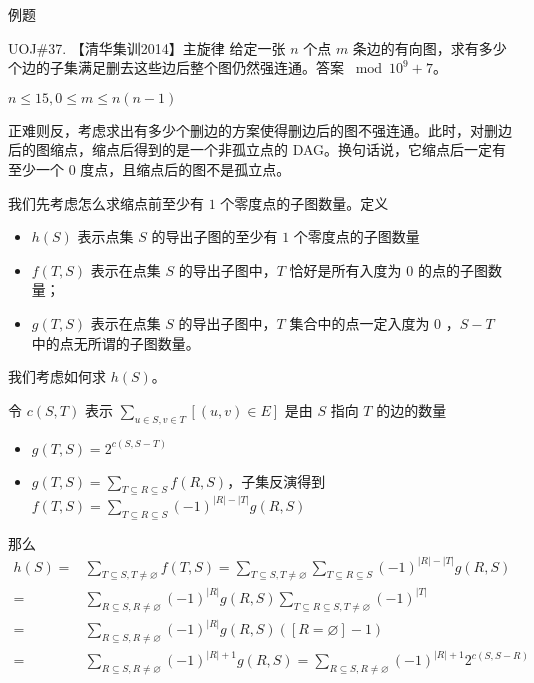 \documentclass[UTF8]{beamer}
\begin{document}
    \begin{frame}{例题}
        \begin{block}{UOJ\#37. 【清华集训2014】主旋律}
            给定一张 $n$ 个点 $m$ 条边的有向图，求有多少个边的子集满足删去这些边后整个图仍然强连通。答案 $\bmod 10^9+7$。

            $n\le 15,0\le m\le n(n-1)$
        \end{block}
        \pause
        正难则反，考虑求出有多少个删边的方案使得删边后的图不强连通。此时，对删边后的图缩点，缩点后得到的是一个非孤立点的 DAG。换句话说，它缩点后一定有至少一个 $0$ 度点，且缩点后的图不是孤立点。

        我们先考虑怎么求缩点前至少有 $1$ 个零度点的子图数量。定义
        \begin{itemize}
            \item  $h(S)$ 表示点集 $S$ 的导出子图的至少有 $1$ 个零度点的子图数量
            \item $f(T,S)$ 表示在点集 $S$ 的导出子图中，$T$ 恰好是所有入度为 $0$ 的点的子图数量；
            \item $g(T,S)$ 表示在点集 $S$ 的导出子图中，$T$ 集合中的点一定入度为 $0$ ，$S-T$ 中的点无所谓的子图数量。
        \end{itemize}
        
        我们考虑如何求 $h(S)$。
    \end{frame}

    \begin{frame}
        令 $c(S,T)$ 表示 $\sum_{u\in S,v\in T}[(u,v)\in E]$ 是由 $S$ 指向 $T$ 的边的数量
        \begin{itemize}
            \item $g(T,S)=2^{c(S,S-T)}$
            \item $\displaystyle g(T,S)=\sum_{T\subseteq R\subseteq S}f(R,S)$，子集反演得到 $\displaystyle f(T,S)=\sum_{T\subseteq R\subseteq S}(-1)^{|R|-|T|}g(R,S)$
        \end{itemize}
那么
$$
\begin{aligned}
h(S)=&\sum_{T\subseteq S,T\ne \varnothing}f(T,S)=\sum_{T\subseteq S,T\ne \varnothing}\sum_{T\subseteq R\subseteq S}(-1)^{|R|-|T|}g(R,S)\\
=&\sum_{R\subseteq S,R\ne \varnothing}(-1)^{|R|}g(R,S)\sum_{T\subseteq R\subseteq S,T\ne \varnothing} (-1)^{|T|}\\
=&\sum_{R\subseteq S,R\ne \varnothing}(-1)^{|R|}g(R,S)([R=\varnothing]-1)\\
=&\sum_{R\subseteq S,R\ne \varnothing}(-1)^{|R|+1}g(R,S) = \sum_{R\subseteq S,R\ne \varnothing}(-1)^{|R|+1}2^{c(S,S-R)}
\end{aligned}
$$
    \end{frame}
\end{document}
